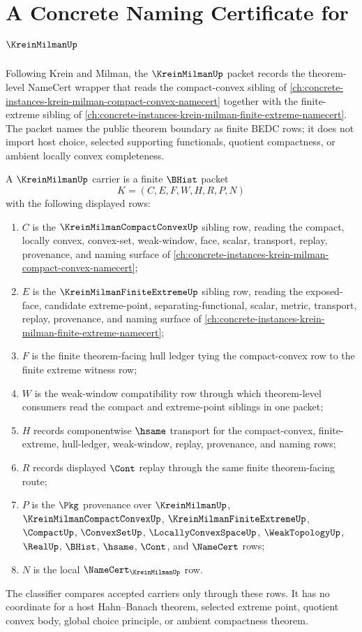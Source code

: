 \chapter{A Concrete Naming Certificate for $\KreinMilmanUp$}
\label{ch:concrete-instances-krein-milman-namecert}

Following Krein and Milman, the $\KreinMilmanUp$ packet records the theorem-level NameCert wrapper that reads the compact-convex sibling of \autoref{ch:concrete-instances-krein-milman-compact-convex-namecert} together with the finite-extreme sibling of \autoref{ch:concrete-instances-krein-milman-finite-extreme-namecert}. The packet names the public theorem boundary as finite BEDC rows; it does not import host choice, selected supporting functionals, quotient compactness, or ambient locally convex completeness.

\begin{definition}
\label{def:krein-milman-carrier}
A $\KreinMilmanUp$ carrier is a finite $\BHist$ packet
$$
K=(C,E,F,W,H,R,P,N)
$$
with the following displayed rows:
\begin{enumerate}
\item $C$ is the $\KreinMilmanCompactConvexUp$ sibling row, reading the compact, locally convex, convex-set, weak-window, face, scalar, transport, replay, provenance, and naming surface of \autoref{ch:concrete-instances-krein-milman-compact-convex-namecert};
\item $E$ is the $\KreinMilmanFiniteExtremeUp$ sibling row, reading the exposed-face, candidate extreme-point, separating-functional, scalar, metric, transport, replay, provenance, and naming surface of \autoref{ch:concrete-instances-krein-milman-finite-extreme-namecert};
\item $F$ is the finite theorem-facing hull ledger tying the compact-convex row to the finite extreme witness row;
\item $W$ is the weak-window compatibility row through which theorem-level consumers read the compact and extreme-point siblings in one packet;
\item $H$ records componentwise $\hsame$ transport for the compact-convex, finite-extreme, hull-ledger, weak-window, replay, provenance, and naming rows;
\item $R$ records displayed $\Cont$ replay through the same finite theorem-facing route;
\item $P$ is the $\Pkg$ provenance over $\KreinMilmanUp$, $\KreinMilmanCompactConvexUp$, $\KreinMilmanFiniteExtremeUp$, $\CompactUp$, $\ConvexSetUp$, $\LocallyConvexSpaceUp$, $\WeakTopologyUp$, $\RealUp$, $\BHist$, $\hsame$, $\Cont$, and $\NameCert$ rows;
\item $N$ is the local $\NameCert_{\KreinMilmanUp}$ row.
\end{enumerate}
The classifier compares accepted carriers only through these rows. It has no coordinate for a host Hahn--Banach theorem, selected extreme point, quotient convex body, global choice principle, or ambient compactness theorem.
\end{definition}


